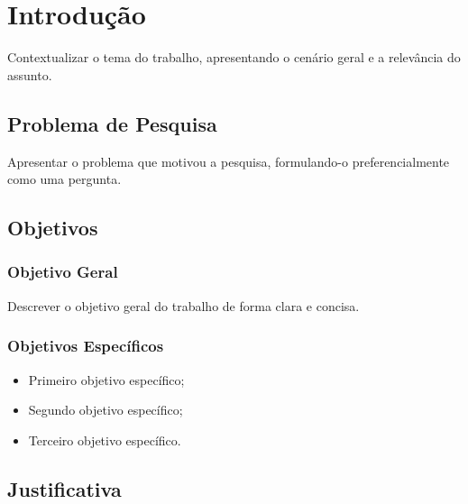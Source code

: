 \chapter{Introdução}

Contextualizar o tema do trabalho, apresentando o cenário geral e a
relevância do assunto.

\section{Problema de Pesquisa}

Apresentar o problema que motivou a pesquisa, formulando-o preferencialmente
como uma pergunta.

\section{Objetivos}

\subsection{Objetivo Geral}

Descrever o objetivo geral do trabalho de forma clara e concisa.

\subsection{Objetivos Específicos}

\begin{itemize}
    \item Primeiro objetivo específico;
    \item Segundo objetivo específico;
    \item Terceiro objetivo específico.
\end{itemize}

\section{Justificativa}

